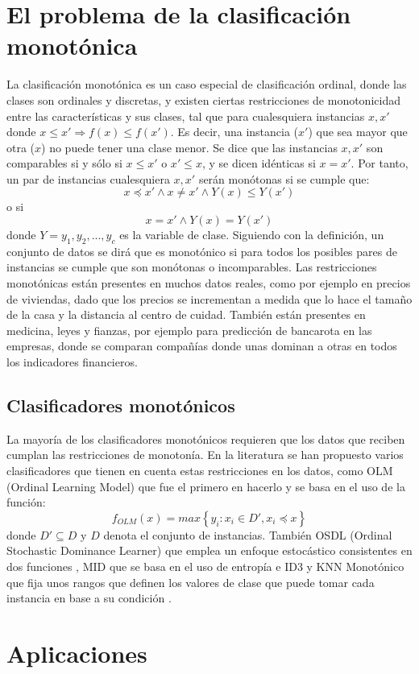 \section{El problema de la clasificación monotónica}
La clasificación monotónica es un caso especial de clasificación ordinal, donde las clases son ordinales y discretas, y existen ciertas restricciones de monotonicidad entre las características y sus clases, tal que para cualesquiera instancias $x, x'$ donde $x \le x' \Rightarrow f(x) \le f(x')$. Es decir, una instancia ($x'$) que sea mayor que otra ($x$) no puede tener una clase menor. Se dice que las instancias $x, x'$ son comparables si y sólo si $x \leq x'$ o $x' \leq x$, y se dicen idénticas si $x=x'$. Por tanto, un par de instancias cualesquiera $x,x'$ serán monótonas si se cumple que: 
$$ x \preceq x' \land x \neq x' \land Y(x) \leq Y(x')$$ o si $$x=x' \land Y(x)=Y(x')$$ donde $Y={y_1,y_2,...,y_c}$ es la variable de clase. \newline
Siguiendo con la definición, un conjunto de datos se dirá que es monotónico si para todos los posibles pares de instancias se cumple que son monótonas o incomparables. \newline
Las restricciones monotónicas están presentes en muchos datos reales, como por ejemplo en precios de viviendas, dado que los precios se incrementan a medida que lo hace el tamaño de la casa y la distancia al centro de cuidad. También están presentes en medicina, leyes y fianzas, por ejemplo para predicción de bancarota en las empresas, donde se comparan compañías donde unas dominan a otras en todos los indicadores financieros.
\subsection{Clasificadores monotónicos}
La mayoría de los clasificadores monotónicos requieren que los datos que reciben cumplan las restricciones de monotonía. En la literatura se han propuesto varios clasificadores que tienen en cuenta estas restricciones en los datos, como OLM (Ordinal Learning Model) \cite{ben1989learning} que fue el primero en hacerlo y se basa en el uso de la función: $$ f_{OLM}(x) = max \left\{ y_i: x_i \in D', x_i \preceq x \right\}$$ donde $D' \subseteq D $ y $D$ denota el conjunto de instancias. También OSDL (Ordinal Stochastic Dominance Learner) que emplea un enfoque estocástico consistentes en dos funciones \cite{lievens2008probabilistic}, MID que se basa en el uso de entropía e ID3 \cite{ben1995monotonicity} y KNN Monotónico que fija unos rangos que definen los valores de clase que puede tomar cada instancia en base a su condición \cite{duivesteijn2008nearest}.
\section{Aplicaciones}
